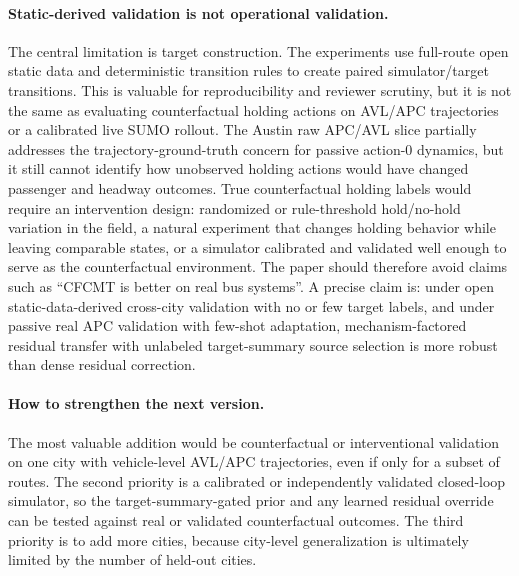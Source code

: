 \paragraph{Static-derived validation is not operational validation.}
The central limitation is target construction.
The experiments use full-route open static data and deterministic transition rules to create paired simulator/target transitions.
This is valuable for reproducibility and reviewer scrutiny, but it is not the same as evaluating counterfactual holding actions on AVL/APC trajectories or a calibrated live SUMO rollout.
The Austin raw APC/AVL slice partially addresses the trajectory-ground-truth concern for passive action-$0$ dynamics, but it still cannot identify how unobserved holding actions would have changed passenger and headway outcomes.
True counterfactual holding labels would require an intervention design: randomized or rule-threshold hold/no-hold variation in the field, a natural experiment that changes holding behavior while leaving comparable states, or a simulator calibrated and validated well enough to serve as the counterfactual environment.
The paper should therefore avoid claims such as ``CFCMT is better on real bus systems''.
A precise claim is: under open static-data-derived cross-city validation with no or few target labels, and under passive real APC validation with few-shot adaptation, mechanism-factored residual transfer with unlabeled target-summary source selection is more robust than dense residual correction.

\paragraph{How to strengthen the next version.}
The most valuable addition would be counterfactual or interventional validation on one city with vehicle-level AVL/APC trajectories, even if only for a subset of routes.
The second priority is a calibrated or independently validated closed-loop simulator, so the target-summary-gated prior and any learned residual override can be tested against real or validated counterfactual outcomes.
The third priority is to add more cities, because city-level generalization is ultimately limited by the number of held-out cities.
